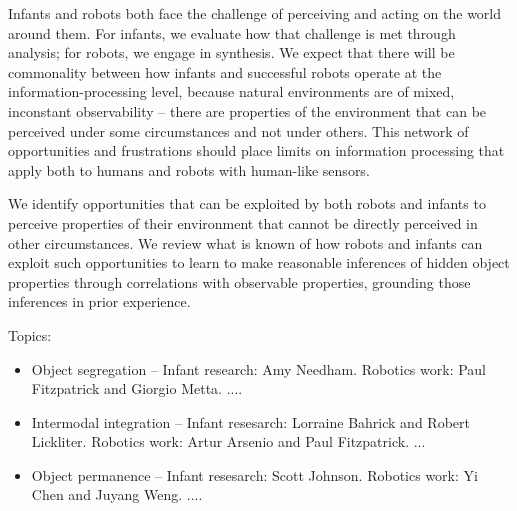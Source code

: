 
Infants and robots both face the challenge of perceiving and acting on
the world around them.  For infants, we evaluate how that challenge is
met through analysis; for robots, we engage in synthesis.  We expect
that there will be commonality between how infants and successful
robots operate at the information-processing level, because natural
environments are of mixed, inconstant observability -- there are
properties of the environment that can be perceived under some
circumstances and not under others.  This network of opportunities and
frustrations should place limits on information processing that apply
both to humans and robots with human-like sensors.

We identify opportunities that can be exploited by both robots and
infants to perceive properties of their environment that cannot be
directly perceived in other circumstances.  We review what is known of
how robots and infants can exploit such opportunities to learn to make
reasonable inferences of hidden object properties through correlations
with observable properties, grounding those inferences in prior
experience.

Topics:

\begin{itemize}

\item Object segregation --
  Infant research: Amy Needham.
  Robotics work: Paul Fitzpatrick and Giorgio Metta. ....

\item Intermodal integration --
  Infant resesarch: Lorraine Bahrick and Robert Lickliter.
  Robotics work: Artur Arsenio and Paul Fitzpatrick. ...

\item Object permanence --
  Infant resesarch: Scott Johnson.
  Robotics work: Yi Chen and Juyang Weng. ....

\end{itemize}

